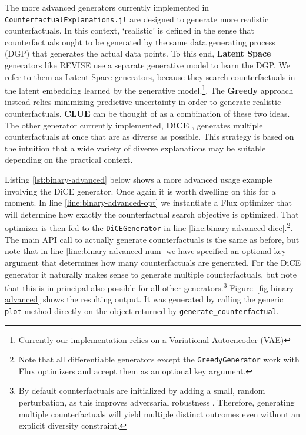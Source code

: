 \documentclass{juliacon}
\begin{document}
The more advanced generators currently implemented in
\texttt{CounterfactualExplanations.jl} are designed to generate more
realistic counterfactuals. In this context, `realistic' is defined in
the sense that counterfactuals ought to be generated by the same data
generating process (DGP) that generates the actual data points. To this
end, \textbf{Latent Space} generators like REVISE
\cite{joshi2019realistic} use a separate generative model to learn the
DGP. We refer to them as Latent Space generators, because they search
counterfactuals in the latent embedding learned by the generative
model.\footnote{Currently our implementation relies on a Variational
  Autoencoder (VAE)}. The \textbf{Greedy} approach
\cite{schut2021generating} instead relies minimizing predictive
uncertainty in order to generate realistic counterfactuals.
\textbf{CLUE} \cite{antoran2020getting} can be thought of as a
combination of these two ideas. The other generator currently
implemented, \textbf{DiCE} \cite{mothilal2020explaining}, generates
multiple counterfactuals at once that are as diverse as possible. This
strategy is based on the intuition that a wide variety of diverse
explanations may be suitable depending on the practical context.

Listing \ref{lst:binary-advanced} below shows a more advanced usage
example involving the DiCE generator. Once again it is worth dwelling on
this for a moment. In line \ref{line:binary-advanced-opt} we instantiate
a Flux optimizer that will determine how exactly the counterfactual
search objective is optimized. That optimizer is then fed to the
\texttt{DiCEGenerator} in line
\ref{line:binary-advanced-dice}.\footnote{Note that all differentiable
  generators except the \texttt{GreedyGenerator} work with Flux
  optimizers and accept them as an optional key argument.}. The main API
call to actually generate counterfactuals is the same as before, but
note that in line \ref{line:binary-advanced-num} we have specified an
optional key argument that determines how many counterfactuals are
generated. For the DiCE generator it naturally makes sense to generate
multiple counterfactuals, but note that this is in principal also
possible for all other generators.\footnote{By default counterfactuals
  are initialized by adding a small, random perturbation, as this
  improves adversarial robustness \cite{slack2021counterfactual}.
  Therefore, generating multiple counterfactuals will yield multiple
  distinct outcomes even without an explicit diversity constraint.}
Figure~\ref{fig-binary-advanced} shows the resulting output. It was
generated by calling the generic \texttt{plot} method directly on the
object returned by \texttt{generate\_counterfactual}.
\end{document}

